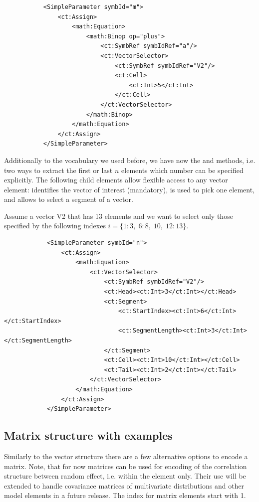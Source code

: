 \lstset{language=XML}
\begin{lstlisting}
           <SimpleParameter symbId="m">
               <ct:Assign>
                   <math:Equation>
                       <math:Binop op="plus">
                           <ct:SymbRef symbIdRef="a"/>
                           <ct:VectorSelector>
                               <ct:SymbRef symbIdRef="V2"/>
                               <ct:Cell>
                                   <ct:Int>5</ct:Int>
                               </ct:Cell>
                           </ct:VectorSelector>
                       </math:Binop>
                   </math:Equation>
               </ct:Assign>
           </SimpleParameter>
\end{lstlisting}

Additionally to the vocabulary we used before, we have now the  and  
methods, i.e. two ways to extract the first or last $n$ elements which number can be specified
explicitly. The following child elements allow flexible access to any vector element: 
 identifies the vector of interest (mandatory), 
 is used to pick one element, and
 allows to select a segment of a vector.


Assume a vector V2 that has 13 elements and we want to select only those specified by the
following indexes $i=\{1:3,\;6:8,\;10,\;12:13\}.$
\lstset{language=XML}
\begin{lstlisting}
            <SimpleParameter symbId="n">
                <ct:Assign>
                    <math:Equation>
                        <ct:VectorSelector>
                            <ct:SymbRef symbIdRef="V2"/>
                            <ct:Head><ct:Int>3</ct:Int></ct:Head>
                            <ct:Segment>
                                <ct:StartIndex><ct:Int>6</ct:Int></ct:StartIndex>
                                <ct:SegmentLength><ct:Int>3</ct:Int></ct:SegmentLength>
                            </ct:Segment>
                            <ct:Cell><ct:Int>10</ct:Int></ct:Cell>
                            <ct:Tail><ct:Int>2</ct:Int></ct:Tail>
                        </ct:VectorSelector>
                    </math:Equation>
                </ct:Assign>
            </SimpleParameter>
\end{lstlisting}


\subsection{Matrix structure with examples}
\label{subsec:matrixStructure}
Similarly to the vector structure there are a few alternative options to encode a matrix.
Note, that for now matrices can be used for encoding of the correlation structure between 
random effect, i.e. within the  element only. Their use will be extended to 
handle covariance matrices of multivariate distributions and other model elements in 
a future release. The index for matrix elements start with 1.

